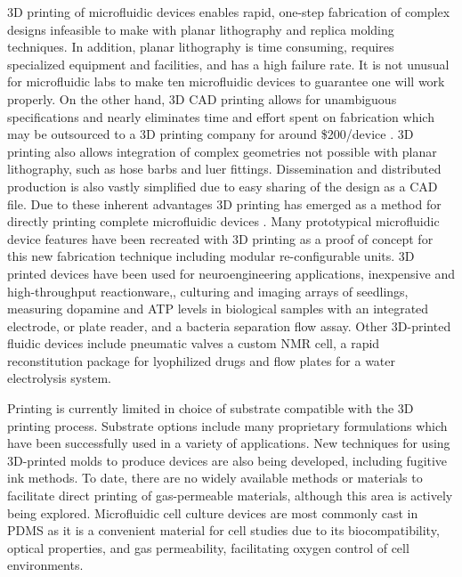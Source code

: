 \documentclass[10pt,letterpaper]{article}
\begin{document}
3D printing of microfluidic devices enables rapid, one-step fabrication of complex designs infeasible to make with planar lithography and replica molding techniques\cite{Waldbaur2011,Chen2014a}.
In addition, planar lithography is time consuming, requires specialized equipment and facilities, and has a high failure rate.
It is not unusual for microfluidic labs to make ten microfluidic devices to guarantee one will work properly.
On the other hand, 3D CAD printing allows for unambiguous specifications and nearly eliminates time and effort spent on fabrication which may be outsourced to a 3D printing company for around \$200/device \cite{Au2014}.
3D printing also allows integration of complex geometries not possible with planar lithography, such as hose barbs and luer fittings.
Dissemination and distributed production is also vastly simplified due to easy sharing of the design as a CAD file.
Due to these inherent advantages 3D printing has emerged as a method for directly printing complete microfluidic devices \cite{Au2014,Comina2014, Chen2014,Shallan2014,Bhargava2014}. 
Many prototypical microfluidic device features have been recreated with 3D printing as a proof of concept for this new fabrication technique \cite{ Au2014, Shallan2014} including modular re-configurable units\cite{Yuen2008,Bhargava2014,Lee2014}.
3D printed devices have been used for neuroengineering applications\cite{Tek2008}, inexpensive and high-throughput reactionware,\cite{Kitson2012,Symes2012,Kitson2013,Kitson2014}, culturing and imaging arrays of seedlings\cite{Busch2012}, measuring dopamine and ATP levels in biological samples with an integrated electrode\cite{Erkal2014}, or plate reader\cite{Chen2014}, and a bacteria separation flow assay\cite{Lee2014a,Lee2015}. 
Other 3D-printed fluidic devices include pneumatic valves\cite{Au2015} a custom NMR cell\cite{Causier2015}, a rapid reconstitution package for lyophilized drugs\cite{Chi2014} and flow plates for a water electrolysis system\cite{Chisholm2014}.

Printing is currently limited in choice of substrate compatible with the 3D printing process.
Substrate options include many proprietary formulations which have been successfully used in a variety of applications.
New techniques for using 3D-printed molds to produce devices\cite{Mcdonald2002,Gregory2013,King2014,Comina2014a,Kamei2015} are also being developed, including fugitive ink methods\cite{Therriault2003,Miller2012,Bhargava2015}.
To date, there are no widely available methods or materials to facilitate direct printing of gas-permeable materials, although this area is actively being explored\cite{Femmer2014a}.
Microfluidic cell culture devices are most commonly cast in PDMS as it is a convenient material for cell studies due to its biocompatibility, optical properties, and gas permeability, facilitating oxygen control of cell environments\cite{Sia2003,Brennan2014}.
\end{document}
